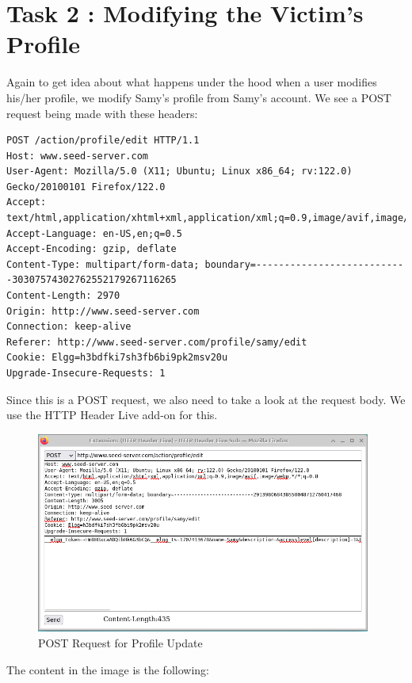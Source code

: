 \documentclass[12pt]{article}
\begin{document}
\newpage


\section*{Task 2 : Modifying the Victim’s Profile}
Again to get idea about what happens under the hood when a user modifies his/her profile, we modify Samy's profile from Samy's account. We see a POST request being made with these headers:

\begin{verbatim}
POST /action/profile/edit HTTP/1.1
Host: www.seed-server.com
User-Agent: Mozilla/5.0 (X11; Ubuntu; Linux x86_64; rv:122.0) Gecko/20100101 Firefox/122.0
Accept: text/html,application/xhtml+xml,application/xml;q=0.9,image/avif,image/webp,*/*;q=0.8
Accept-Language: en-US,en;q=0.5
Accept-Encoding: gzip, deflate
Content-Type: multipart/form-data; boundary=---------------------------30307574302762552179267116265
Content-Length: 2970
Origin: http://www.seed-server.com
Connection: keep-alive
Referer: http://www.seed-server.com/profile/samy/edit
Cookie: Elgg=h3bdfki7sh3fb6bi9pk2msv20u
Upgrade-Insecure-Requests: 1
\end{verbatim}

Since this is a POST request, we also need to take a look at the request body. We use the HTTP Header Live add-on for this.

     \begin{figure}[H]
         \centering
         \includegraphics[width=0.98\textwidth]{Images/ss2.png}
         \caption{POST Request for Profile Update}
         \label{fig:ss2}
     \end{figure}


The content in the image is the following:
\end{document}
